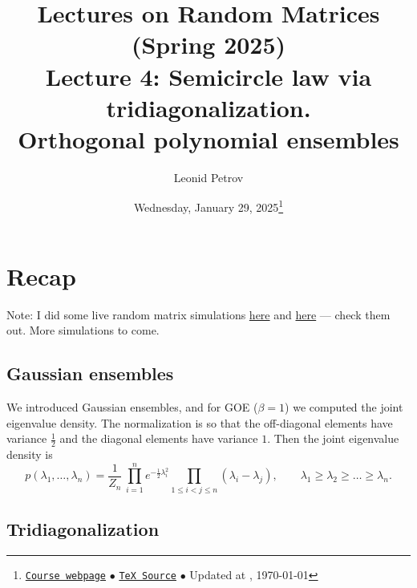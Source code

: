 \documentclass[letterpaper,11pt,oneside,reqno]{article}
\numberwithin{equation}{section}
\theoremstyle{definition}
\begin{document}
\title{Lectures on Random Matrices
(Spring 2025)
\\Lecture 4: Semicircle law via tridiagonalization. \\Orthogonal polynomial ensembles}


\date{Wednesday, January 29, 2025\footnote{\href{https://lpetrov.cc/rmt25/}{\texttt{Course webpage}}
$\bullet$ \href{https://lpetrov.cc/rmt25/rmt25-notes/rmt2025-l04.tex}{\texttt{TeX Source}}
$\bullet$
Updated at \currenttime, \today}}



\author{Leonid Petrov}


\maketitle
\tableofcontents

\section{Recap}

Note: I did some live random matrix simulations
\href{https://lpetrov.cc/simulations/2025-01-28-goe/}{here}
and
\href{https://lpetrov.cc/simulations/2025-01-28-bbp-transition/}{here}
--- check them out. More simulations to come.

\subsection{Gaussian ensembles}

We introduced Gaussian ensembles,
and for GOE ($\beta=1$) we computed the joint eigenvalue density.
The normalization is so that the off-diagonal elements have variance $\frac{1}{2}$
and the diagonal elements have variance $1$.
Then the joint eigenvalue density is
\begin{equation*}
	p(\lambda_1,\ldots,\lambda_n)
	=
	\frac{1}{Z_n}\,
	\prod_{i=1}^n e^{-\frac{1}{2}\lambda_i^2}
	\prod_{1\le i<j\le n}(\lambda_i - \lambda_j),
	\qquad
	\lambda_1\ge \lambda_2\ge \ldots \ge \lambda_n.
\end{equation*}

\subsection{Tridiagonalization}
\end{document}
